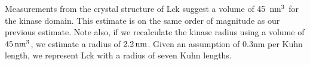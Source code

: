 \documentclass[../AdvancementSummary.tex]{subfiles}
\begin{document}
Measurements from the crystal structure of Lck suggest a volume of 45 $\,\mbox{nm}^3$ for the kinase domain.  This estimate is on the same order of magnitude as our previous estimate.  Note also, if we recalculate the kinase radius using a volume of $45 \,\mbox{nm}^3$, we estimate a radius of $2.2 \,\mbox{nm}$. Given an assumption of 0.3nm per Kuhn length, we represent Lck with a radius of seven Kuhn lengths.

%
%

%
%


\end{document}
